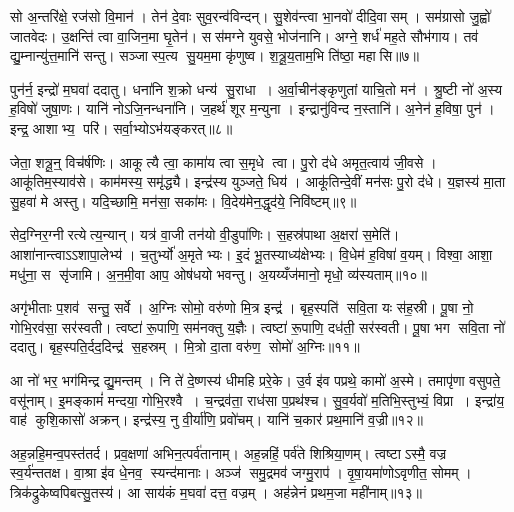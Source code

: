 सो अ॒न्तरि॑क्षे॒ रज॑सो वि॒मान॑। तेन॑ दे॒वाः सुव॒रन्व॑विन्दन्। सु॒शेव॑न्त्वा भा॒नवो॑ दीदि॒वासम्। सम॑ग्रासो जु॒ह्वो॑ जातवेदः। उ॒क्षन्ति॑ त्वा वा॒जिन॒मा घृ॒तेन॑। सस॑मग्ने युवसे॒ भोज॑नानि। अग्ने॒ शर्ध॑ मह॒ते सौभ॑गाय। तव॑ द्यु॒म्नान्यु॑त्त॒मानि॑ सन्तु। सञ्जास्प॒त्य सु॒यम॒मा कृ॑णुष्व। श॒त्रू॒य॒ताम॒भि ति॑ष्ठा॒ महासि॥७॥\anuvakamend[अ॒स्त्वे॒तु॒ रोहि॑तो॒ नाको॒ महासि]

पुन॑र्न॒ इन्द्रो॑ म॒घवा॑ ददातु। धना॑नि श॒क्रो धन्य॑ सु॒राधा। अ॒र्वा॒चीन॑ङ्कृणुतां याचि॒तो मन॑। श्रु॒ष्टी नो॑ अ॒स्य ह॒विषो॑ जुषा॒णः। यानि॑ नोऽजि॒नन्धना॑नि। ज॒हर्थ॑ शूर म॒न्युना। इन्द्रानु॑विन्द न॒स्तानि॑। अ॒नेन॑ ह॒विषा॒ पुन॑। इन्द्र॒ आशाभ्य॒ परि॑। सर्वा॒भ्योऽभ॑यङ्करत्॥८॥

जेता॒ शत्रू॒न्॒ विच॑र्\mbox{}षणिः। आकूत्यै त्वा॒ कामा॑य त्वा स॒मृधे त्वा। पु॒रो द॑धे अमृत॒त्वाय॑ जी॒वसे। आकू॑तिम॒स्याव॑से। काम॑मस्य॒ समृ॑द्ध्यै। इन्द्र॑स्य युञ्जते॒ धिय॑। आकू॑तिन्दे॒वीं मन॑सः पु॒रो द॑धे। य॒ज्ञस्य॑ मा॒ता सु॒हवा॑ मे अस्तु। यदि॒च्छामि॒ मन॑सा॒ सका॑मः। वि॒देय॑मेन॒द्धृद॑ये॒ निवि॑ष्टम्॥९॥

सेद॒ग्निर॒ग्नीरत्येत्य॒न्यान्। यत्र॑ वा॒जी तन॑यो वी॒डुपा॑णिः। स॒हस्र॑पाथा अ॒क्षरा॑ स॒मेति॑। आशा॑नान्त्वाऽऽशापा॒लेभ्य॑। च॒तुर्भ्यो॑ अ॒मृतेभ्यः। इ॒दं भू॒तस्याध्य॑क्षेभ्यः। वि॒धेम॑ ह॒विषा॑ व॒यम्। विश्वा॒ आशा॒ मधु॑ना॒ स सृ॑जामि। अ॒न॒मी॒वा आप॒ ओष॑धयो भवन्तु। अ॒यय्यँज॑मानो॒ मृधो॒ व्य॑स्यताम्॥१०॥

अगृ॑भीताः प॒शव॑ सन्तु॒ सर्वे। अ॒ग्निः सोमो॒ वरु॑णो मि॒त्र इन्द्र॑। बृह॒स्पति॑ सवि॒ता यः स॑ह॒स्री। पू॒षा नो॒ गोभि॒रव॑सा॒ सर॑स्वती। त्वष्टा॑ रू॒पाणि॒ सम॑नक्तु य॒ज्ञैः। त्वष्टा॑ रू॒पाणि॒ दध॑ती॒ सर॑स्वती। पू॒षा भग सवि॒ता नो॑ ददातु। बृह॒स्पति॒र्दद॒दिन्द्र॑ स॒हस्रम्। मि॒त्रो दा॒ता वरु॑ण॒ सोमो॑ अ॒ग्निः॥११॥\anuvakamend[क॒र॒न्निवि॑ष्टमस्यता॒न्नव॑ च]

आ नो॑ भर॒ भग॑मिन्द्र द्यु॒मन्तम्। नि ते॑ दे॒ष्णस्य॑ धीमहि प्ररे॒के। उ॒र्व इ॑व पप्रथे॒ कामो॑ अ॒स्मे। तमापृ॑णा वसुपते॒ वसू॑नाम्। इ॒मङ्कामं॑ मन्दया॒ गोभि॒रश्वै। च॒न्द्रव॑ता॒ राध॑सा प॒प्रथ॑श्च। सु॒व॒र्यवो॑ म॒तिभि॒स्तुभ्यं॒ विप्रा। इन्द्रा॑य॒ वाह॑ कुशि॒कासो॑ अक्रन्। इन्द्र॑स्य॒ नु वी॒र्या॑णि॒ प्रवो॑चम्। यानि॑ च॒कार॑ प्रथ॒मानि॑ व॒ज्री॥१२॥

अह॒न्नहि॒मन्व॒पस्त॑तर्द। प्रव॒क्षणा॑ अभिन॒त्पर्व॑तानाम्। अह॒न्नहिं॒ पर्व॑ते शिश्रिया॒णम्। त्वष्टाऽस्मै॒ वज्र स्व॒र्य॑न्ततक्ष। वा॒श्रा इ॑व धे॒नव॒ स्यन्द॑मानाः। अञ्ज॑ समु॒द्रमव॑ जग्मु॒राप॑। वृ॒षा॒यमा॑णोऽवृणीत॒ सोमम्। त्रिक॑द्रुकेष्वपिबत्सु॒तस्य॑। आ साय॑कं म॒घवा॑ दत्त॒ वज्रम्। अह॑न्नेनं प्रथम॒जा मही॑नाम्॥१३॥

